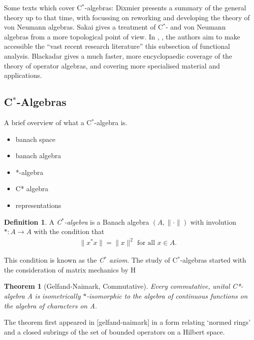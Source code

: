 \documentclass[12pt,a4paper]{amsart}
\theoremstyle{plain}
\newtheorem*{thm*}{Theorem}
\theoremstyle{definition}
\newtheorem{defn}{Definition}
\begin{document}
	Some texts which cover C$^\ast$-algebras: 
	Dixmier \cite{dixmier77} presents a summary of the general theory up to that time, with \cite{dixmier81} focussing on reworking and developing the theory of von Neumann algebras. 
	Sakai \cite{sakai71} gives a treatment of C$^\ast$- and von Neumann algebras from a more topological point of view.
	In \cite{kadison83}, \cite{kadison86}, the authors aim to make accessible the ``vast recent research literature'' this subsection of functional analysis.
	Blackadar \cite{blackadar06} gives a much faster, more encyclopaedic coverage of the theory of operator algebras, and covering more specialised material and applications.
	

	
\subsection{C$^\ast$-Algebras}
	A brief overview of what a C$^\ast$-algebra is.
\begin{itemize}
	\item banach space
	\item banach algebra
	\item *-algebra
	\item C* algebra
	\item representations
\end{itemize}
\begin{defn}
A \emph{C$^\ast$-algebra} is a Banach algebra $(A, \| \cdot \|)$ with involution $\ast : A \to A$ with the condition that
\begin{align*}
	\|x ^\ast x\| = \|x\|^2 \mbox{ for all } x \in A.
\end{align*}
\end{defn}
 
This condition is known as the \emph{C$^\ast$ axiom}. The study of C$^\ast$-algebras started with the consideration of matrix mechanics by H


\begin{thm*}[Gelfand-Naimark, Commutative]
	Every commutative, unital C*-algebra A is isometrically $\ast$-isomorphic to the algebra of continuous functions on the algebra of characters on A.

\end{thm*}
The theorem first appeared in [gelfand-naimark] in a form relating `normed rings' and a closed subrings of the set of bounded operators on a Hilbert space.
\end{document}
